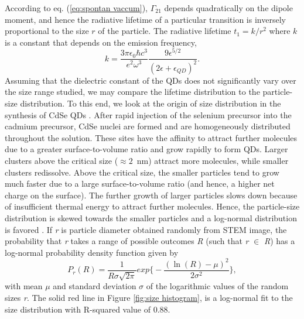 \documentclass[%
 aip,
 amsmath,amssymb,
 reprint,%
]{revtex4-1}
\begin{document}
According to eq. (\ref{eq:spontan vaccum}), $\Gamma_{21}$ depends quadratically on the dipole moment, and hence the radiative lifetime of a particular transition is inversely proportional to the size $r$ of the particle. The radiative lifetime $t_1 = k/r^2$ where $k$ is a constant that depends on the emission frequency,
\begin{equation}
k = \frac{3 \pi \epsilon_0 \hbar c^3}{e^2 \omega ^3} \frac{9 \epsilon^{5/2}}{(2 \epsilon + \epsilon_{QD})^2}.
\label{eq:constant}
\end{equation}
Assuming that the dielectric constant of the QDs does not significantly vary over the size range studied, we may compare the lifetime distribution to the particle-size distribution. To this end, we look at the origin of size distribution in the synthesis of CdSe QDs \cite{FF}. 
After rapid injection of the selenium precursor into the cadmium precursor,  CdSe nuclei are formed and are homogeneously distributed throughout the solution. These sites have the affinity to attract further molecules due to a greater surface-to-volume ratio and grow rapidly to form QDs. Larger clusters above the critical size ($\approx 2$~nm) attract more molecules, while smaller clusters redissolve. Above the critical size, the smaller particles tend to grow much faster due to a large surface-to-volume ratio (and hence, a higher net charge on the surface). The further growth of larger particles slows down because of  insufficient thermal energy to attract further molecules. Hence, the particle-size distribution is skewed towards the smaller particles and a log-normal distribution is favored \cite{AAQ}.
If \textit{r} is particle diameter obtained randomly from STEM image, the probability that \textit{r} takes a range of possible outcomes \textit{R} (such that \textit{r} $\in$ \textit{R}) has  a log-normal probability density function given by
\begin{equation}
    P_r(R) = \frac{1}{R \sigma \sqrt{2 \pi}} exp \Biggl \{- \frac{(\ln(R)- \mu)^2}{2 \sigma^2} \Biggr \},
    \label{eq:size distribution}
\end{equation}
with mean  $\mu$ and standard deviation $\sigma$  of the logarithmic values of the random sizes \textit{r}. The solid red line in Figure \ref{fig:size histogram}, is a log-normal fit to the size distribution with R-squared value of 0.88.
\end{document}

